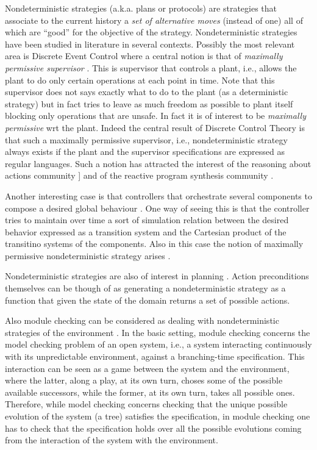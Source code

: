 Nondeterministic strategies (a.k.a. plans or protocols) are strategies
that associate to the current history a \emph{set of alternative
  moves} (instead of one) all of which are ``good'' for the objective
of the strategy.
Nondeterministic strategies have been studied in literature in several
contexts.
Possibly the most relevant area is Discrete Event Control where a
central notion is that of \emph{maximally permissive supervisor}
\cite{WonhamRamadge:SIAMJCO87,Cassandras:BOOK06_DES,Wo14}. This is
supervisor that controls a plant, i.e., allows the plant to do only
certain operations at each point in time. Note that this supervisor
does not says exactly what to do to the plant (as a deterministic
strategy) but in fact tries to leave as much freedom as possible to
plant itself blocking only operations that are unsafe. In fact it is
of interest to be \emph{maximally permissive} wrt the plant. 
Indeed the central result of Discrete Control Theory is that such a
maximally permissive supervisor, i.e., nondeterministic strategy
always exists if the plant and the supervisor specifications are
expressed as regular languages. Such a notion has attracted the interest
of the reasoning about actions community
]\cite{DeGiacomoLM12,BanihashemiGL-AAMAS18} and of the reactive program
synthesis community \cite{pnueli1989synthesisshort,EhlersLTV17}.


Another interesting case is that controllers that orchestrate several components to compose a desired global behaviour \cite{DePS13,DeGiacomoVFAL18}. One way of seeing this is that the controller tries to maintain over time a sort of simulation relation between the desired behavior expressed as a transition system and the Cartesian product of the transitino systems of the components. Also in this case the notion of maximally permissive nondeterministic strategy arises \cite{DePS13}.


Nondeterministic strategies are also of interest in planning \cite{GeffnerBo13}.  Action preconditions themselves can be though of as generating a nondeterministic strategy  as a function that given the state of the domain returns a set of possible actions. 

Also module checking can be considered as dealing with nondeterministic strategies of the environment \cite{kupferman1997module,jamroga2014module}. In the basic setting, module checking concerns the model checking problem of an open system, i.e., a system interacting continuously with its unpredictable environment, against a branching-time specification. This interaction can be seen as a game between the system and the environment, where the latter, along a play, at its own turn, choses some of the possible available successors, while the former, at its own turn, takes all possible ones. Therefore, while model checking concerns checking that the unique possible evolution of the system (a tree) satisfies the specification, in module checking one has to check that the specification holds over all the possible evolutions coming from the interaction of the system with the environment.

